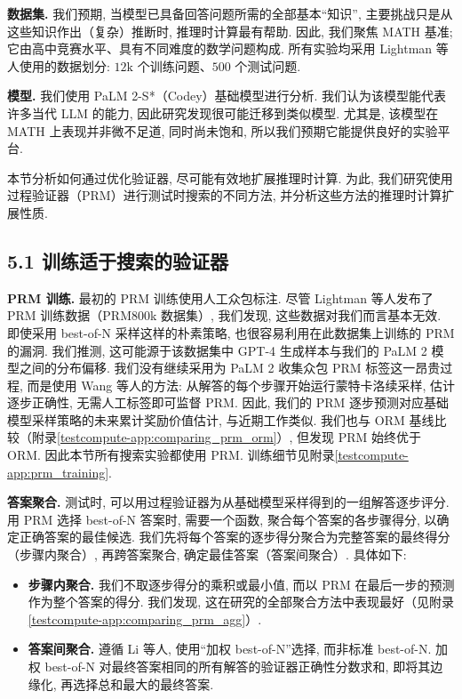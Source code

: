 \textbf{数据集. }我们预期, 当模型已具备回答问题所需的全部基本“知识”, 主要挑战只是从这些知识作出（复杂）推断时, 推理时计算最有帮助. 因此, 我们聚焦 MATH 基准\cite{testcompute-hendrycks2021measuring}; 它由高中竞赛水平、具有不同难度的数学问题构成. 所有实验均采用 Lightman 等人\cite{testcompute-lightman2023lets}使用的数据划分: $12\mathrm{k}$ 个训练问题、$500$ 个测试问题. 

\textbf{模型. }我们使用 PaLM 2-S*\cite{testcompute-anil2023palm}（Codey）基础模型进行分析. 我们认为该模型能代表许多当代 LLM 的能力, 因此研究发现很可能迁移到类似模型. 尤其是, 该模型在 MATH 上表现并非微不足道, 同时尚未饱和, 所以我们预期它能提供良好的实验平台. 

本节分析如何通过优化验证器, 尽可能有效地扩展推理时计算. 为此, 我们研究使用过程验证器（PRM）进行测试时搜索的不同方法, 并分析这些方法的推理时计算扩展性质. 

\subsection*{5.1 训练适于搜索的验证器}
\textbf{PRM 训练. }最初的 PRM 训练\cite{testcompute-uesato2022solving,testcompute-lightman2023lets}使用人工众包标注. 尽管 Lightman 等人\cite{testcompute-lightman2023lets}发布了 PRM 训练数据（PRM800k 数据集）, 我们发现, 这些数据对我们而言基本无效. 即使采用 best-of-N 采样这样的朴素策略, 也很容易利用在此数据集上训练的 PRM 的漏洞. 我们推测, 这可能源于该数据集中 GPT-4 生成样本与我们的 PaLM 2 模型之间的分布偏移. 我们没有继续采用为 PaLM 2 收集众包 PRM 标签这一昂贵过程, 而是使用 Wang 等人\cite{testcompute-wang2023mathshepherd}的方法: 从解答的每个步骤开始运行蒙特卡洛续采样, 估计逐步正确性, 无需人工标签即可监督 PRM. 因此, 我们的 PRM 逐步预测对应基础模型采样策略的未来累计奖励价值估计, 与近期工作\cite{testcompute-wang2023mathshepherd,testcompute-setlur2024rl}类似. 我们也与 ORM 基线比较（附录\ref{testcompute-app:comparing_prm_orm}）, 但发现 PRM 始终优于 ORM. 因此本节所有搜索实验都使用 PRM. 训练细节见附录\ref{testcompute-app:prm_training}. 

\textbf{答案聚合. }测试时, 可以用过程验证器为从基础模型采样得到的一组解答逐步评分. 用 PRM 选择 best-of-N 答案时, 需要一个函数, 聚合每个答案的各步骤得分, 以确定正确答案的最佳候选. 我们先将每个答案的逐步得分聚合为完整答案的最终得分（步骤内聚合）, 再跨答案聚合, 确定最佳答案（答案间聚合）. 具体如下: 
\begin{itemize}
\item \textbf{步骤内聚合. }我们不取逐步得分的乘积或最小值\cite{testcompute-wang2023mathshepherd,testcompute-lightman2023lets}, 而以 PRM 在最后一步的预测作为整个答案的得分. 我们发现, 这在研究的全部聚合方法中表现最好（见附录\ref{testcompute-app:comparing_prm_agg}）. 
\item \textbf{答案间聚合. }遵循 Li 等人\cite{testcompute-li2023making}, 使用“加权 best-of-N”选择, 而非标准 best-of-N. 加权 best-of-N 对最终答案相同的所有解答的验证器正确性分数求和, 即将其边缘化, 再选择总和最大的最终答案. 
\end{itemize}

